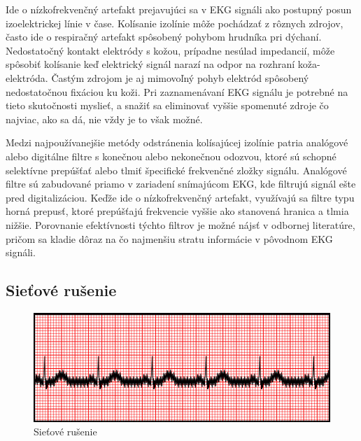 Ide o nízkofrekvenčný artefakt prejavujúci sa v EKG signáli ako postupný posun izoelektrickej línie v čase. Kolísanie izolínie môže pochádzať z rôznych zdrojov, často ide o respiračný artefakt spôsobený pohybom hrudníka pri dýchaní. Nedostatočný kontakt elektródy s kožou, prípadne nesúlad impedancií, môže spôsobiť kolísanie keď elektrický signál narazí na odpor na rozhraní koža-elektróda. Častým zdrojom je aj mimovoľný pohyb elektród spôsobený nedostatočnou fixáciou ku koži.\cite{Romero2018} Pri zaznamenávaní EKG signálu je potrebné na tieto skutočnosti myslieť, a snažiť sa eliminovať vyššie spomenuté zdroje čo najviac, ako sa dá, nie vždy je to však možné.

Medzi najpoužívanejšie metódy odstránenia kolísajúcej izolínie patria analógové alebo digitálne filtre s konečnou alebo nekonečnou odozvou, ktoré sú schopné selektívne prepúšťať alebo tlmiť špecifické frekvenčné zložky signálu. Analógové filtre sú zabudované priamo v zariadení snímajúcom EKG, kde filtrujú signál ešte pred digitalizáciou. Keďže ide o nízkofrekvenčný artefakt, využívajú sa filtre typu horná prepusť, ktoré prepúšťajú frekvencie vyššie ako stanovená hranica a tlmia nižšie. Porovnanie efektívnosti týchto filtrov je možné nájsť v odbornej literatúre, pričom sa kladie dôraz na čo najmenšiu stratu informácie v pôvodnom EKG signáli.\cite{Romero2018}\cite{Kaur2011}

\subsection{Sieťové rušenie}

\begin{figure}[H]
    \centering
    \includegraphics[scale=0.7]{img/acinterference.jpg}
    \caption{Sieťové rušenie\cite{Mauvila_2018}}
\end{figure}

